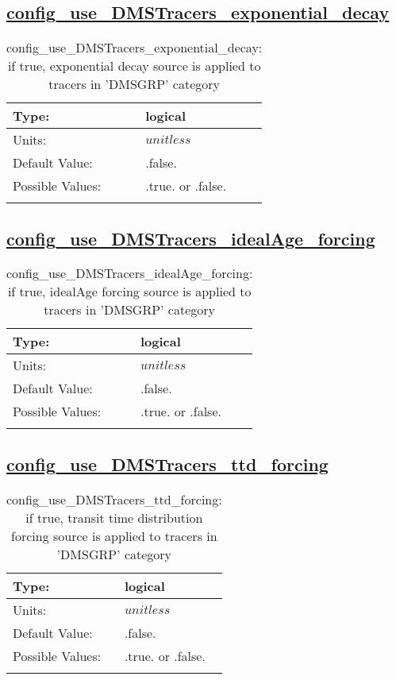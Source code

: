 \subsection[config\_use\_DMSTracers\_exponential\_decay]{\hyperref[sec:nm_tab_tracer_forcing_DMSTracers]{config\_use\_DMSTracers\_exponential\_decay}}
\label{subsec:nm_sec_config_use_DMSTracers_exponential_decay}
\begin{center}
\begin{longtable}{| p{2.0in} || p{4.0in} |}
    \hline
    Type: & logical \\
    \hline
    Units: & $unitless$ \\
    \hline
    Default Value: & .false. \\
    \hline
    Possible Values: & .true. or .false. \\
    \hline
    \caption{config\_use\_DMSTracers\_exponential\_decay: if true, exponential decay source is applied to tracers in 'DMSGRP' category}
\end{longtable}
\end{center}
\subsection[config\_use\_DMSTracers\_idealAge\_forcing]{\hyperref[sec:nm_tab_tracer_forcing_DMSTracers]{config\_use\_DMSTracers\_idealAge\_forcing}}
\label{subsec:nm_sec_config_use_DMSTracers_idealAge_forcing}
\begin{center}
\begin{longtable}{| p{2.0in} || p{4.0in} |}
    \hline
    Type: & logical \\
    \hline
    Units: & $unitless$ \\
    \hline
    Default Value: & .false. \\
    \hline
    Possible Values: & .true. or .false. \\
    \hline
    \caption{config\_use\_DMSTracers\_idealAge\_forcing: if true, idealAge forcing source is applied to tracers in 'DMSGRP' category}
\end{longtable}
\end{center}
\subsection[config\_use\_DMSTracers\_ttd\_forcing]{\hyperref[sec:nm_tab_tracer_forcing_DMSTracers]{config\_use\_DMSTracers\_ttd\_forcing}}
\label{subsec:nm_sec_config_use_DMSTracers_ttd_forcing}
\begin{center}
\begin{longtable}{| p{2.0in} || p{4.0in} |}
    \hline
    Type: & logical \\
    \hline
    Units: & $unitless$ \\
    \hline
    Default Value: & .false. \\
    \hline
    Possible Values: & .true. or .false. \\
    \hline
    \caption{config\_use\_DMSTracers\_ttd\_forcing: if true, transit time distribution forcing source is applied to tracers in 'DMSGRP' category}
\end{longtable}
\end{center}
